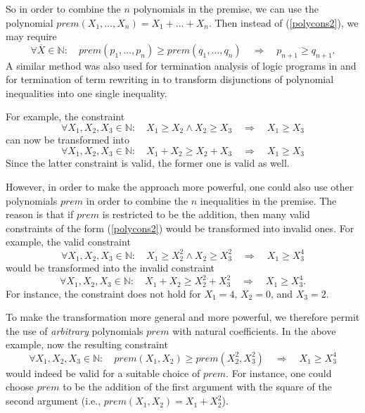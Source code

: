 \documentclass[envcountsame]{tlp}
\newcounter{polycons2ctr}
\newcounter{polycons1ctr}
\newcounter{ex:der-lastsymconsctr}
\begin{document}
So in order to combine the $n$ polynomials in the premise, we can use the
polynomial $\mathit{prem}(X_1,\ldots,X_n) = X_1 + \ldots + X_n$. Then instead
of (\ref{polycons2}), we may require
\[
   \forall \overline{X} \in \mathbb{N}: \quad \mathit{prem}(p_1,\ldots,p_n) \ge
\mathit{prem}(q_1,\ldots,q_n)
\quad \Rightarrow \quad p_{n+1} \ge q_{n+1}.
\]
A similar method
was also used  for termination
analysis of logic programs in \cite{Decorteetal98} and  for termination of term rewriting
in \cite[Section 7.2]{JAR07} to transform
disjunctions of polynomial inequalities into one single inequality.


For example, the constraint
\[ \forall X_1,X_2,X_3 \in \mathbb{N}: \quad X_1 \ge X_2 \wedge X_2 \ge  X_3
\quad \Rightarrow 
\quad X_1 \geq X_3\]
can now be transformed into
\[ \forall X_1,X_2,X_3 \in \mathbb{N}: \quad X_1 + X_2 \ge X_2 +  X_3
\quad \Rightarrow \quad X_1 \geq X_3\]
Since the latter constraint is valid, the former one is valid as well.

However, in order to make the approach more powerful, one could also use other
polynomials $\mathit{prem}$ in order to combine the $n$ inequalities in the
premise. The reason is that if $\mathit{prem}$ is restricted to be the
addition, then many valid constraints of the form (\ref{polycons2}) would be
transformed into invalid ones. For example, the valid constraint
\[ \forall X_1,X_2,X_3 \in \mathbb{N}: \quad X_1 \ge X_2^2 \wedge X_2 \ge X_3^2
\quad \Rightarrow \quad X_1  \geq X_3^4\]
would be transformed into the invalid constraint
\[ \forall X_1,X_2,X_3 \in \mathbb{N}: \quad X_1 + X_2 \ge X_2^2 +  X_3^2
\quad \Rightarrow \quad X_1 \geq X_3^4.\]
For instance, the constraint does not hold for
$X_1 = 4$, $X_2 = 0$, and $X_3 = 2$.



To make the transformation more general and more powerful,
we therefore permit
the use of \emph{arbitrary} polynomials $\mathit{prem}$ with natural
coefficients. In the above example, now the resulting constraint
\[ \forall X_1,X_2,X_3 \in \mathbb{N}: \quad \mathit{prem}(X_1,X_2) \ge \mathit{prem}(X_2^2,X_3^2)
\quad \Rightarrow \quad X_1 \geq X_3^4\]
would indeed be valid for a suitable choice of $\mathit{prem}$. For instance,
one could choose $\mathit{prem}$ to be the addition of the first argument with
the square of the second argument (i.e., $\mathit{prem}(X_1,X_2) = X_1 +
X^2_2$). 
\end{document}
